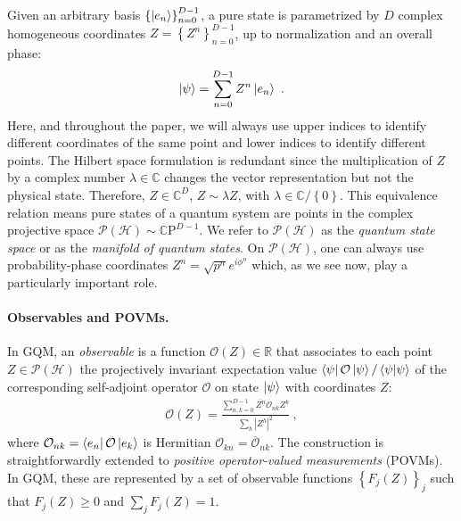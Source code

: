 \documentclass[%
 reprint,
 superscriptaddress,
 aps,
 pra,
]{revtex4-2}
\newcommand{\PH}{\mathcal{P}(\mathcal{H})}
\theoremstyle{definition}
\begin{document}
Given an arbitrary basis $\left\{\ket{e_n} \right\}_{n=0}^{D-1}$, a pure state is
parametrized by $D$ complex homogeneous coordinates $Z = \left\{      Z^n\right\}_{n=0}^{D-1}$, up to
normalization and an overall phase:
\begin{align*}
\ket{\psi} = \sum_{n=0}^{D-1} Z^n \ket{e_n}~.
\end{align*}
Here, and throughout the paper, we will always use upper indices to identify different 
coordinates of the same point and lower indices to identify different points. The Hilbert space
formulation is redundant since the multiplication of $Z$ by a complex number $\lambda \in \mathbb{C}$ changes the 
vector representation but not the physical state. Therefore, $Z \in \mathbb{C}^{D}$, $Z \sim \lambda Z$, 
with $\lambda \in \mathbb{C}/\left\{ 0\right\}$. This equivalence relation means pure states of a quantum 
system are points in the complex projective space $\mathcal{P}\left(\mathcal{H} \right) \sim \mathbb{C}\mathrm{P}^{D-1}$. 
We refer to $\PH$ as the \emph{quantum state space} or as the \emph{manifold of quantum states}. 
On $\PH$, one can always use probability-phase coordinates $Z^n = \sqrt{p^n} e^{i\phi^n}$ which, as we 
see now, play a particularly important role.

\paragraph*{Observables and POVMs.} In GQM, an \emph{observable} is a function $\mathcal{O}(Z) \in
\mathbb{R}$ that associates to each point  $Z \in \mathcal{P}(\mathcal{H})$ the
projectively invariant expectation value $\bra{\psi} \mathcal{O} \ket{\psi}/\braket{\psi}{\psi}$ of 
the corresponding self-adjoint operator $\mathcal{O}$ on state $\ket{\psi}$ with coordinates $Z$:
\begin{align}
\mathcal{O}(Z) = \frac{\sum_{n,k=0}^{D-1} \overline{Z^n} \mathcal{O}_{nk}Z^k }{\sum_{h} \left\vert Z^h\right\vert^2}
  ~,
\label{eq:GQM_Observable}
\end{align}
where $\mathcal{O}_{nk}=\bra{e_n}\mathcal{O}\ket{e_k}$ is Hermitian $\mathcal{O}_{kn} = \overline{\mathcal{O}}_{nk}$. The 
construction is straightforwardly extended to \emph{positive operator-valued measurements} \cite{Nielsen2010QuantumComputationQuantum,Heinosaari2011MathematicalLanguageQuantum} (POVMs).
In GQM, these are represented by a set of observable functions $\left\{F_j(Z)\right\}_j$ such that $F_j(Z) \geq 0$ and $\sum_{j}F_j(Z) = 1$.
\end{document}
